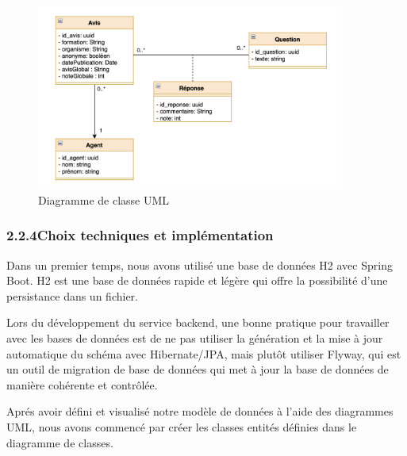         \begin{figure}[h!]
            \centering
            \includegraphics[width=0.9\textwidth]{images/diagramme/cllasse.png}
            \caption{Diagramme de classe UML}
        \end{figure}
        \medskip
    
        \subsubsection{2.2.4\hspace{2em}Choix techniques et implémentation}
        Dans un premier temps, nous avons utilisé une base de données H2 avec Spring Boot. 
        H2 est une base de données rapide et légère qui offre la possibilité d'une persistance 
        dans un fichier.\medskip
        
        Lors du développement du service backend, une bonne pratique pour travailler avec les 
        bases de données est de ne pas utiliser la génération et la mise à jour automatique du 
        schéma avec Hibernate/JPA, mais plutôt utiliser Flyway, qui est un outil de migration 
        de base de données qui met à jour la base de données de manière cohérente et contrôlée.\vspace{0.5cm}

        Aprés avoir défini et visualisé notre modèle de données à l'aide des diagrammes UML, 
        nous avons commencé par créer les classes entités définies dans le diagramme de classes.
        \vspace{11cm}

